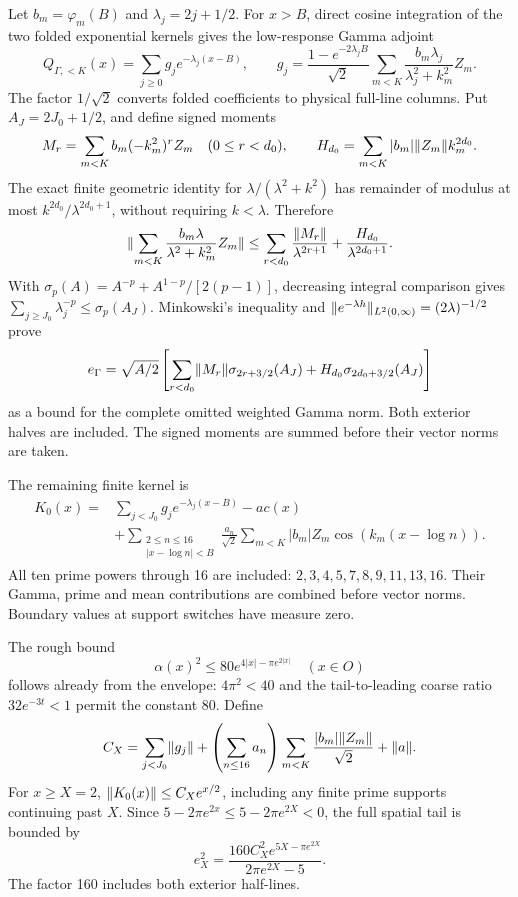 Let $b_m=\varphi_m(B)$ and $\lambda_j=2j+1/2$.
For $x>B$, direct cosine integration of the two folded exponential
kernels gives the low-response Gamma adjoint
\begin{equation}\label{eq:Qgamma}
 Q_{\Gamma,<K}(x)=\sum_{j\ge0}g_je^{-\lambda_j(x-B)},\qquad
 g_j=\frac{1-e^{-2\lambda_jB}}{\sqrt2}
       \sum_{m<K}\frac{b_m\lambda_j}{\lambda_j^2+k_m^2}Z_m.
\end{equation}
The factor $1/\sqrt2$ converts folded coefficients to physical
full-line columns. Put $A_J=2J_0+1/2$, and define signed moments
\[
 M_r=\sum_{m<K}b_m(-k_m^2)^rZ_m\quad(0\le r<d_0),\qquad
 H_{d_0}=\sum_{m<K}|b_m|\lVert Z_m\rVert k_m^{2d_0}.
\]
The exact finite geometric identity for
$\lambda/(\lambda^2+k^2)$ has remainder of modulus at most
$k^{2d_0}/\lambda^{2d_0+1}$, without requiring $k<\lambda$.
Therefore
\[
 \lVert\sum_{m<K}\frac{b_m\lambda}{\lambda^2+k_m^2}Z_m\rVert
 \le\sum_{r<d_0}\frac{\lVert M_r\rVert}{\lambda^{2r+1}}
       +\frac{H_{d_0}}{\lambda^{2d_0+1}}.
\]
With $\sigma_p(A)=A^{-p}+A^{1-p}/[2(p-1)]$, decreasing integral
comparison gives $\sum_{j\ge J_0}\lambda_j^{-p}\le\sigma_p(A_J)$.
Minkowski's inequality and
$\lVert e^{-\lambda h}\rVert_{L^2(0,\infty)}=(2\lambda)^{-1/2}$ prove
\begin{equation}\label{eq:egamma}
 e_\Gamma=\sqrt{A/2}\left[
 \sum_{r<d_0}\lVert M_r\rVert\sigma_{2r+3/2}(A_J)
 +H_{d_0}\sigma_{2d_0+3/2}(A_J)\right]
\end{equation}
as a bound for the complete omitted weighted Gamma norm. Both
exterior halves are included. The signed moments are summed before
their vector norms are taken.

The remaining finite kernel is
\begin{equation}\label{eq:K0}
 \begin{split}
 K_0(x)={}&\sum_{j<J_0}g_je^{-\lambda_j(x-B)}-ac(x)\\
 &+\sum_{\substack{2\le n\le16\\|x-\log n|<B}}
  \frac{a_n}{\sqrt2}\sum_{m<K}|b_m|Z_m\cos(k_m(x-\log n)).
 \end{split}
\end{equation}
All ten prime powers through 16 are included:
$2,3,4,5,7,8,9,11,13,16$. Their Gamma, prime and mean contributions
are combined before vector norms. Boundary values at support switches
have measure zero.

The rough bound
\begin{equation}\label{eq:roughalpha}
 \alpha(x)^2\le80e^{4|x|-\pi e^{2|x|}}\quad(x\in O)
\end{equation}
follows already from the envelope: $4\pi^2<40$ and the tail-to-leading
coarse ratio $32e^{-3t}<1$ permit the constant 80.
Define
\[
 C_X=\sum_{j<J_0}\lVert g_j\rVert
 +\left(\sum_{n\le16}a_n\right)
      \sum_{m<K}\frac{|b_m|\lVert Z_m\rVert}{\sqrt2}+\lVert a\rVert.
\]
For $x\ge X=2$, $\lVert K_0(x)\rVert\le C_Xe^{x/2}$, including any finite
prime supports continuing past $X$. Since
$5-2\pi e^{2x}\le5-2\pi e^{2X}<0$, the full spatial tail is bounded by
\begin{equation}\label{eq:eX}
 e_X^2=\frac{160C_X^2e^{5X-\pi e^{2X}}}{2\pi e^{2X}-5}.
\end{equation}
The factor 160 includes both exterior half-lines.

